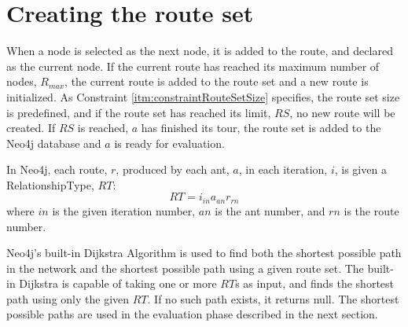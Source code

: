 \section{Creating the route set}
\label{sec:algoCreatingRouteSet}

When a node is selected as the next node, it is added to the route, and declared as the current node. If the current route has reached its maximum number of nodes, $R_{max}$, the current route is added to the route set and a new route is initialized. As Constraint \vref{itm:constraintRouteSetSize} specifies, the route set size is predefined, and if the route set has reached its limit, $RS$, no new route will be created. If $RS$ is reached, $a$ has finished its tour, the route set is added to the Neo4j database and $a$ is ready for evaluation. 

In Neo4j, each route, $r$, produced by each ant, $a$, in each iteration, $i$, is given a RelationshipType, $RT$:
$$RT = i_{in}a_{an}r_{rn}$$
where $in$ is the given iteration number, $an$ is the ant number, and $rn$ is the route number.

Neo4j's built-in Dijkstra Algorithm is used to find both the shortest possible path in the network and the shortest possible path using a given route set. The built-in Dijkstra is capable of taking one or more $RT$s as input, and finds the shortest path using only the given $RT$. If no such path exists, it returns null. The shortest possible paths are used in the evaluation phase described in the next section.